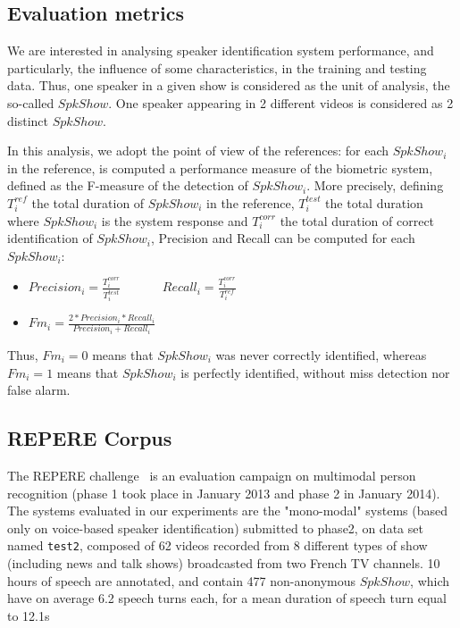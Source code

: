 
\subsection{Evaluation metrics}
\vspace*{-0.1cm}
We are interested in analysing speaker identification system performance, and particularly, the influence of some characteristics, in the training and testing data. Thus, one speaker in a given show is considered as the unit of analysis, the so-called $SpkShow$. One speaker appearing in 2 different videos is considered as 2 distinct $SpkShow$. 

In this analysis, we adopt the point of view of the references: for each $SpkShow_i$ in the reference, is computed a performance measure of the biometric system, defined as the F-measure of the detection of $SpkShow_i$. More precisely, defining $T^{ref}_i$ the total duration of $SpkShow_i$ in the reference, $T^{test}_i$ the total duration where $SpkShow_i$ is the system response and $T^{corr}_i$ the total duration of correct identification of $SpkShow_i$, Precision and Recall can be computed for each $SpkShow_i$:
\begin{itemize}
\item $Precision_i=\frac{T^{corr}_i}{T^{test}_i}$ ~~~~~~$Recall_i=\frac{T^{corr}_i}{T^{ref}_i}$
\item $Fm_i=\frac{2*Precision_i*Recall_i}{Precision_i+Recall_i}$
\end{itemize} 

Thus, $Fm_i=0$ means that $SpkShow_i$ was never correctly identified, whereas $Fm_i=1$ means that $SpkShow_i$ is perfectly identified, without miss detection nor false alarm.

\subsection{REPERE Corpus~\cite{Giraudel2012}}

The REPERE challenge~\cite{KAHN--CBMI--2012} is an evaluation campaign on multimodal person recognition (phase 1 took place in January 2013 and phase 2 in January 2014).  The systems evaluated in our experiments are the "mono-modal" systems (based only on voice-based speaker identification) submitted to phase2, on data set named \texttt{test2}, composed of 62 videos recorded from 8 different types of show (including news and talk shows) broadcasted from two French TV channels. 10 hours of speech are annotated, and contain 477 non-anonymous $SpkShow$, which have on average 6.2 speech turns each, for a mean duration of speech turn equal to 12.1s


